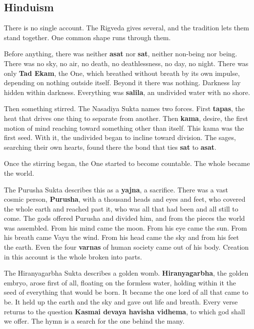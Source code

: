 
\subsection{Hinduism}

There is no single account. The Rigveda gives several, and the tradition lets them stand together. One common shape runs through them.

Before anything, there was neither \textbf{asat} nor \textbf{sat}, neither non-being nor being. There was no sky, no air, no death, no deathlessness, no day, no night. There was only \textbf{Tad Ekam}, the One, which breathed without breath by its own impulse, depending on nothing outside itself. Beyond it there was nothing. Darkness lay hidden within darkness. Everything was \textbf{salila}, an undivided water with no shore.

Then something stirred. The Nasadiya Sukta names two forces. First \textbf{tapas}, the heat that drives one thing to separate from another. Then \textbf{kama}, desire, the first motion of mind reaching toward something other than itself. This kama was the first seed. With it, the undivided began to incline toward division. The sages, searching their own hearts, found there the bond that ties \textbf{sat} to \textbf{asat}.

Once the stirring began, the One started to become countable. The whole became the world.

The Purusha Sukta describes this as a \textbf{yajna}, a sacrifice. There was a vast cosmic person, \textbf{Purusha}, with a thousand heads and eyes and feet, who covered the whole earth and reached past it, who was all that had been and all still to come. The gods offered Purusha and divided him, and from the pieces the world was assembled. From his mind came the moon. From his eye came the sun. From his breath came Vayu the wind. From his head came the sky and from his feet the earth. Even the four \textbf{varnas} of human society came out of his body. Creation in this account is the whole broken into parts.

The Hiranyagarbha Sukta describes a golden womb. \textbf{Hiranyagarbha}, the golden embryo, arose first of all, floating on the formless water, holding within it the seed of everything that would be born. It became the one lord of all that came to be. It held up the earth and the sky and gave out life and breath. Every verse returns to the question \textbf{Kasmai devaya havisha vidhema}, to which god shall we offer. The hymn is a search for the one behind the many.

